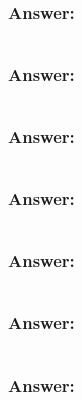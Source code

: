 \documentclass[titlepage]{article}\usepackage[]{graphicx}\usepackage[]{color}
\begin{document}
\subsubsection{Answer:}

\section{}
\begin{quote}
  \textbf{ }
\end{quote}
\subsubsection{Answer:}

\section{}
\begin{quote}
  \textbf{ }
\end{quote}
\subsubsection{Answer:}




\section{}
\begin{quote}
  \textbf{ }
\end{quote}
\subsubsection{Answer:}

\section{}
\begin{quote}
  \textbf{ }
\end{quote}
\subsubsection{Answer:}

\section{}
\begin{quote}
  \textbf{ }
\end{quote}
\subsubsection{Answer:}

\section{}
\begin{quote}
  \textbf{ }
\end{quote}
\subsubsection{Answer:}

  
\end{document}
